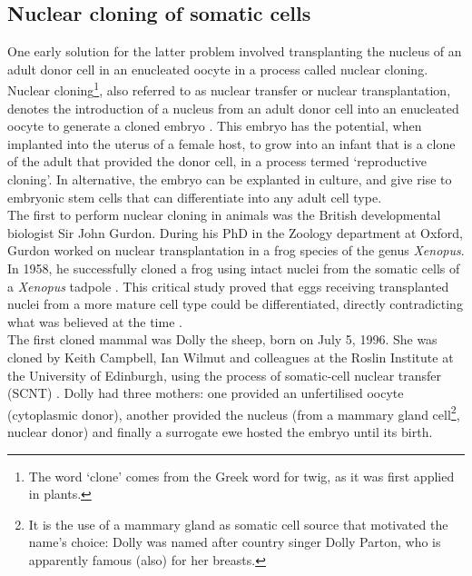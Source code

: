 \subsection{Nuclear cloning of somatic cells}
\label{sec:cloning} 
One early solution for the latter problem involved transplanting the nucleus of an adult donor cell in an enucleated oocyte in a process called nuclear cloning. \\

Nuclear cloning\footnote{The word `clone' comes from the Greek word for twig, as it was first applied in plants.}, also referred to as nuclear transfer or nuclear transplantation, denotes the introduction of a nucleus from an adult donor cell into an enucleated oocyte to generate a cloned embryo \cite{hochedlinger2003nuclear}.
This embryo has the potential, when implanted into the uterus of a female host, to grow into an infant that is a clone of the adult that provided the donor cell, in a process termed `reproductive cloning'. 
In alternative, the embryo can be explanted in culture, and give rise to embryonic stem cells that can differentiate into any adult cell type.\\

The first to perform nuclear cloning in animals was the British developmental biologist Sir John Gurdon. 
During his PhD in the Zoology department at Oxford, Gurdon worked on nuclear transplantation in a frog species of the genus \textit{Xenopus}.
In 1958, he successfully cloned a frog using intact nuclei from the somatic cells of a \textit{Xenopus} tadpole \cite{gurdon1962developmental}.
This critical study proved that eggs receiving transplanted nuclei from a more mature cell type could be differentiated, directly contradicting what was believed at the time \cite{king1955changes}. \\

The first cloned mammal was Dolly the sheep, born on July 5, 1996.
She was cloned by Keith Campbell, Ian Wilmut and colleagues at the Roslin Institute at the University of Edinburgh, using the process of somatic-cell nuclear transfer (SCNT) \cite{wilmut1997viable}.
Dolly had three mothers: one provided an unfertilised oocyte (cytoplasmic donor), another provided the nucleus (from a mammary gland cell\footnote{It is the use of a mammary gland as somatic cell source that motivated the name's choice: Dolly was named after country singer Dolly Parton, who is apparently famous (also) for her breasts.}, nuclear donor) and finally a surrogate ewe hosted the embryo until its birth.\\

